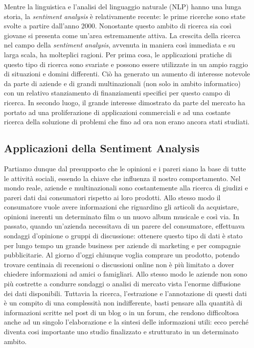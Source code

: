 \documentclass[a4paper,12pt,openright,twoside]{report}
\theoremstyle{definition}
\begin{document}
Mentre la linguistica e l'analisi del linguaggio naturale (NLP) hanno una lunga
storia, la \emph{sentiment analysis} è relativamente recente: le prime ricerche
sono state svolte a partire dall'anno 2000. Nonostante questo ambito di ricerca sia così giovane 
si presenta come un'area estremamente attiva.
La crescita della ricerca nel campo della \emph{sentiment analysis}, avvenuta in maniera così immediata e su larga scala, 
ha molteplici ragioni. 
Per prima cosa, le applicazioni pratiche 
di questo tipo di ricerca sono svariate e possono essere utilizzate in un ampio raggio di 
situazioni e domini differenti. Ciò ha generato un aumento di interesse notevole da parte di
aziende e di grandi multinazionali (non solo in ambito informatico)
con un relativo stanziamento di finanziamenti specifici per questo campo di ricerca.
In secondo luogo, il grande interesse dimostrato da parte del mercato ha portato ad una proliferazione di 
applicazioni commerciali e ad una costante ricerca della soluzione di problemi
che fino ad ora non erano ancora stati studiati.

\subsection{Applicazioni della Sentiment Analysis}
Partiamo dunque dal presupposto che le opinioni e i pareri siano la base di tutte le attività sociali,
 essendo la chiave che influenza il nostro comportamento. Nel mondo reale, aziende e multinazionali 
 sono costantemente alla ricerca di giudizi e pareri dati dai consumatori  rispetto ai loro prodotti. 
 Allo stesso modo il consumatore vuole avere informazioni che riguardino gli articoli da acquistare, 
 opinioni inerenti un determinato film o un nuovo album musicale e così via. In passato, quando un’azienda 
 necessitava di un parere del consumatore, effettuava sondaggi d’opinione o gruppi di discussione: 
 ottenere questo tipo di dati è stato per lungo tempo un grande business per aziende di marketing e 
 per compagnie pubblicitarie.
Al giorno d’oggi chiunque voglia comprare un prodotto, potendo trovare centinaia di recensioni o 
discussioni online non è più limitato a dover chiedere informazioni ad amici o famigliari. 
Allo stesso modo le aziende non sono più costrette a condurre sondaggi o analisi di mercato vista 
l’enorme diffusione dei dati disponibili. Tuttavia la ricerca, l’estrazione e l’annotazione di questi 
dati è un compito di una complessità non indifferente, basti pensare alla quantità di informazioni 
scritte nel post di un blog o in un forum, che rendono difficoltosa anche ad un singolo l'elaborazione 
e la sintesi delle informazioni utili: ecco perché diventa cosi importante uno studio finalizzato e 
strutturato in un determinato ambito.
\end{document}
